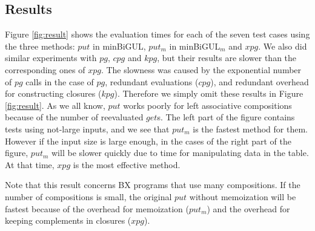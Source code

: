 \subsection{Results}




Figure \ref{fig:result} 
shows the evaluation times for each of the seven test cases using the three methods: $put$ in minBiGUL, $put_m$ in minBiGUL$_m$ and $xpg$.
We also did similar experiments with $pg$, $cpg$ and $kpg$, but their results are slower than the corresponding ones of $xpg$. The slowness was caused by the exponential number of $pg$ calls in the case of $pg$, redundant evaluations ($cpg$), and redundant overhead for constructing closures ($kpg$).
Therefore we simply omit these results in Figure \ref{fig:result}.
As we all know, $put$ works poorly for left associative compositions because of the number of reevaluated $get$s.
The left part of the figure contains tests using not-large inputs, and we see that $put_m$ is the fastest method for them. However if the input size is large enough, in the cases of the right part of the figure, $put_m$ will be slower quickly due to time for manipulating data in the table. At that time, $xpg$ is 
the most effective method.

Note that this result concerns BX programs that use many compositions. If the number of compositions is small, the original $put$ without memoization will be fastest because of the overhead for memoization ($put_m$) and the overhead for keeping complements in closures ($xpg$).

